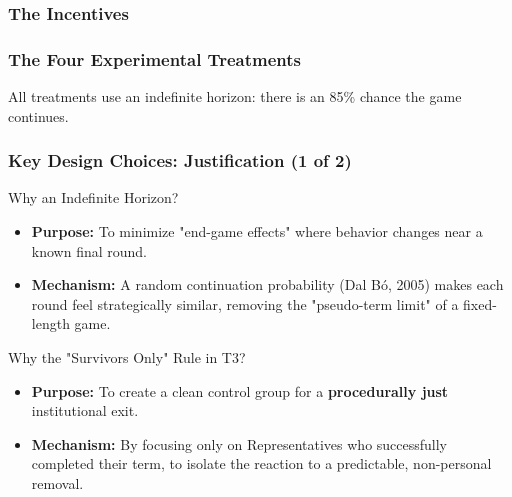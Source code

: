\documentclass[10pt]{beamer}
\begin{document}
\begin{frame}
  \frametitle{The Incentives}

\end{frame}

\begin{frame}
  \frametitle{The Four Experimental Treatments}
  All treatments use an indefinite horizon: there is an 85\% chance the game continues.
\end{frame}

\begin{frame}
  \frametitle{Key Design Choices: Justification (1 of 2)}
  
  \begin{block}{Why an Indefinite Horizon?}
    \begin{itemize}
        \item \textbf{Purpose:} To minimize "end-game effects" where behavior changes near a known final round.
        \item \textbf{Mechanism:} A random continuation probability (Dal Bó, 2005) makes each round feel strategically similar, removing the "pseudo-term limit" of a fixed-length game.
    \end{itemize}
  \end{block}
  
  \begin{block}{Why the "Survivors Only" Rule in T3?}
    \begin{itemize}
        \item \textbf{Purpose:} To create a clean control group for a \textbf{procedurally just} institutional exit.
        \item \textbf{Mechanism:} By focusing only on Representatives who successfully completed their term, to isolate the reaction to a predictable, non-personal removal.
    \end{itemize}
  \end{block}
\end{frame}
\end{document}
